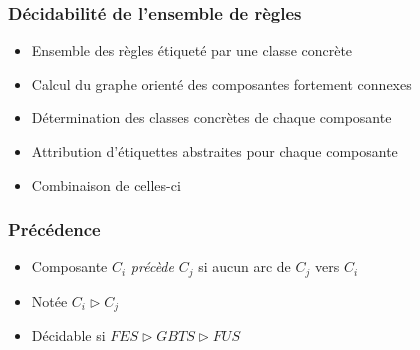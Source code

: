 
\begin{frame}
	\frametitle{Décidabilité de l'ensemble de règles}
	\begin{itemize}
		\item Ensemble des règles étiqueté par une classe concrète
		\item Calcul du graphe orienté des composantes fortement connexes
		\item Détermination des classes concrètes de chaque composante
		\item Attribution d'étiquettes abstraites pour chaque composante
		\item Combinaison de celles-ci
	\end{itemize}
\end{frame}

\begin{frame}
	\frametitle{Précédence}
	\begin{itemize}
		\item Composante $C_i$ {\em précède} $C_j$ si aucun arc de $C_j$ vers $C_i$
		\item Notée $C_i \triangleright C_j$
		\item Décidable si $FES \triangleright GBTS \triangleright FUS$
	\end{itemize}
\end{frame}


